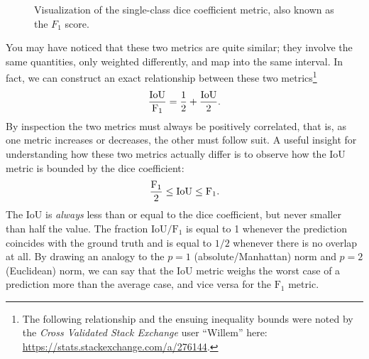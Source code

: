 \begin{figure}[H]
  \centering
  
  \caption{%
    Visualization of the single-class dice coefficient metric, also known as the $F_1$ score.
  }%
  \label{fig:dice-coefficient}
\end{figure}

You may have noticed that these two metrics are quite similar; they involve the same quantities, only weighted differently, and map into the same interval.
In fact, we can construct an exact relationship between these two metrics\footnote{The following relationship and the ensuing inequality bounds were noted by the \textit{Cross Validated Stack Exchange} user \enquote{Willem} here: \url{https://stats.stackexchange.com/a/276144}.}
%
\begin{equation*}
  \frac{%
    \mathrm{IoU}
  }{%
    \mathrm{F_1}
  }
  =
  \frac{1}{2}
  +
  \frac{%
    \mathrm{IoU}
  }{%
    2
  }.
\end{equation*}
%
By inspection the two metrics must always be positively correlated, that is, as one metric increases or decreases, the other must follow suit.
A useful insight for understanding how these two metrics actually differ is to observe how the IoU metric is bounded by the dice coefficient:
%
\begin{equation*}
    \frac{%
      \mathrm{F_1}
    }{%
      2
    }
  \leq
    \mathrm{IoU}
  \leq
    \mathrm{F_1}.
\end{equation*}
%
The IoU is \textit{always} less than or equal to the dice coefficient, but never smaller than half the value.
The fraction $\mathrm{IoU} / \mathrm{F_1}$ is equal to 1 whenever the prediction coincides with the ground truth and is equal to $1/2$ whenever there is no overlap at all.
By drawing an analogy to the $p = 1$ (absolute/Manhattan) norm and $p = 2$ (Euclidean) norm, we can say that the $\mathrm{IoU}$ metric weighs the worst case of a prediction more than the average case, and vice versa for the $\mathrm{F_1}$ metric.
